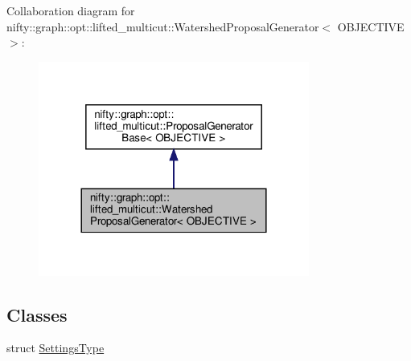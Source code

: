 Collaboration diagram for nifty\+:\+:graph\+:\+:opt\+:\+:lifted\+\_\+multicut\+:\+:Watershed\+Proposal\+Generator$<$ O\+B\+J\+E\+C\+T\+I\+VE $>$\+:
\nopagebreak
\begin{figure}[H]
\begin{center}
\leavevmode
\includegraphics[width=252pt]{classnifty_1_1graph_1_1opt_1_1lifted__multicut_1_1WatershedProposalGenerator__coll__graph}
\end{center}
\end{figure}
\subsection*{Classes}
\begin{DoxyCompactItemize}
\item 
struct \hyperlink{structnifty_1_1graph_1_1opt_1_1lifted__multicut_1_1WatershedProposalGenerator_1_1SettingsType}{Settings\+Type}
\end{DoxyCompactItemize}
